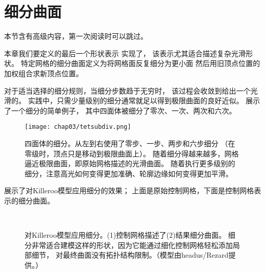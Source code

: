 \section{细分曲面}\label{sec:细分曲面}
\begin{remark}
    本节含有高级内容，第一次阅读时可以跳过。
\end{remark}

本章我们要定义的最后一个形状表示
实现了，
该表示尤其适合描述复杂光滑形状。
特定网格的细分曲面定义为将网格面反复细分为更小面
然后用旧顶点位置的加权组合求新顶点位置。

对于适当选择的细分规则，当细分步数趋于无穷时，
该过程会收敛到给出一个光滑的。
实践中，只需少量级别的细分通常就足以得到极限曲面的良好近似。
展示了一个细分的简单例子，
其中四面体被细分了零次、一次、两次和六次。
\begin{figure}[htbp]
    \centering\texttt{[image: chap03/tetsubdiv.png]}
    \caption{四面体的细分。从左到右使用了零步、一步、两步和六步细分
        （在零级时，顶点只是移动到极限曲面上）。
        随着细分得越来越多，网格逼近极限曲面，即原始网格描述的光滑曲面。
        随着执行更多级别的细分，注意高光如何变得更加准确、轮廓边缘如何变得更加平滑。}
    \label{fig:3.24}
\end{figure}

展示了对Killeroo模型应用细分的效果；
上面是原始控制网格，下面是控制网格表示的细分曲面。
\begin{figure}[htbp]
    \centering
    \\
    \caption{对Killeroo模型应用细分。(1)控制网格描述了(2)结果细分曲面。
        细分非常适合建模这样的形状，因为它能通过细化控制网格轻松添加局部细节，
        对最终曲面没有拓扑结构限制。（模型由headus/Rezard提供。）}
    \label{fig:3.25}
\end{figure}


